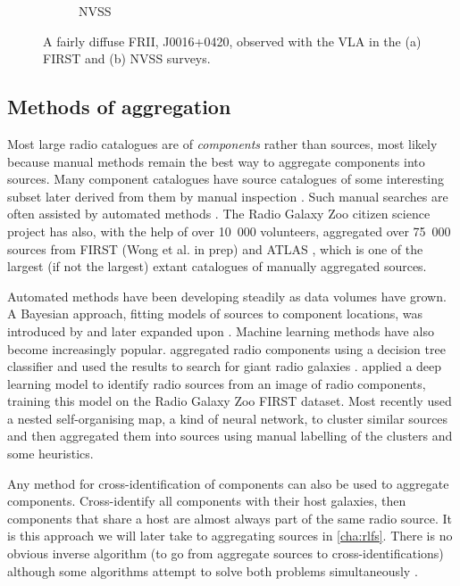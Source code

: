 \begin{figure}
\begin{subfigure}{0.45\textwidth}
                \caption{NVSS \citep{condon98nvss}}
                \label{fig:im-contours-nvss}
            \end{subfigure}
            \caption[An example of a `resolved out' radio galaxy.]{\label{fig:resolved-out} A fairly diffuse FRII, J0016+0420, observed with the VLA in the (a) FIRST and (b) NVSS surveys. \citep[GRG1 from ][]{dabhade_discovery_2017}}
        \end{figure}

    \subsection{Methods of aggregation}
    \label{sec:methods-aggregation}

        Most large radio catalogues are of \emph{components} rather than sources, most likely because manual methods remain the best way to aggregate components into sources. Many component catalogues have source catalogues of some interesting subset later derived from them by manual inspection \citep[e.g.][]{dabhade_discovery_2017}. Such manual searches are often assisted by automated methods \citep[e.g.][]{proctor_morphological_2011}. The Radio Galaxy Zoo citizen science project has also, with the help of over 10~000 volunteers, aggregated over 75~000 sources from FIRST (Wong et al. in prep) and ATLAS \citep{banfield15}, which is one of the largest (if not the largest) extant catalogues of manually aggregated sources.

        Automated methods have been developing steadily as data volumes have grown. A Bayesian approach, fitting models of sources to component locations, was introduced by \citet{fan15} and later expanded upon \citep{fan_optimal_2020}. Machine learning methods have also become increasingly popular. \citet{proctor_selection_2016} aggregated radio components using a decision tree classifier and used the results to search for giant radio galaxies \citep[see also][]{proctor_morphological_2011,proctor06}. \citet{wu19claran} applied a deep learning model to identify radio sources from an image of radio components, training this model on the Radio Galaxy Zoo FIRST dataset. Most recently \citet{galvin_cataloguing_2020} used a nested self-organising map, a kind of neural network, to cluster similar sources and then aggregated them into sources using manual labelling of the clusters and some heuristics.

        Any method for cross-identification of components can also be used to aggregate components. Cross-identify all components with their host galaxies, then components that share a host are almost always part of the same radio source. It is this approach we will later take to aggregating sources in \autoref{cha:rlfs}. There is no obvious inverse algorithm (to go from aggregate sources to cross-identifications) although some algorithms attempt to solve both problems simultaneously \citep{fan_optimal_2020,fan15}.

